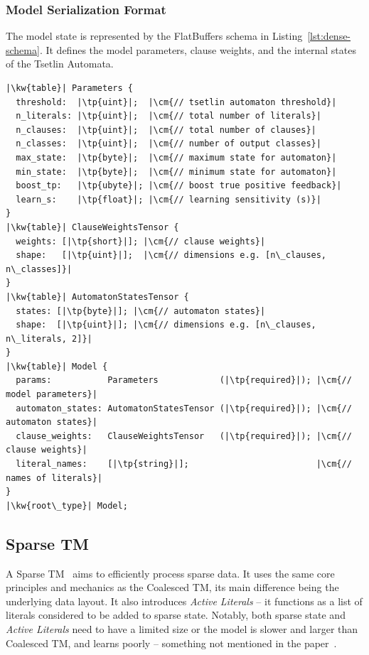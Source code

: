 \subsubsection{Model Serialization Format}

The model state is represented by the FlatBuffers schema in Listing~\ref{lst:dense-schema}. It defines the model parameters, clause weights, and the internal states of the Tsetlin Automata.

\begin{listing}[!htbp]
    \caption[Coalesced TM FlatBuffers serialization format]{Coalesced TM FlatBuffers serialization format\label{lst:dense-schema}}
    \begin{verbatim}
|\kw{table}| Parameters {
  threshold:  |\tp{uint}|;  |\cm{// tsetlin automaton threshold}|
  n_literals: |\tp{uint}|;  |\cm{// total number of literals}|
  n_clauses:  |\tp{uint}|;  |\cm{// total number of clauses}|
  n_classes:  |\tp{uint}|;  |\cm{// number of output classes}|
  max_state:  |\tp{byte}|;  |\cm{// maximum state for automaton}|
  min_state:  |\tp{byte}|;  |\cm{// minimum state for automaton}|
  boost_tp:   |\tp{ubyte}|; |\cm{// boost true positive feedback}|
  learn_s:    |\tp{float}|; |\cm{// learning sensitivity (s)}|
}
|\kw{table}| ClauseWeightsTensor {
  weights: [|\tp{short}|]; |\cm{// clause weights}|
  shape:   [|\tp{uint}|];  |\cm{// dimensions e.g. [n\_clauses, n\_classes]}|
}
|\kw{table}| AutomatonStatesTensor {
  states: [|\tp{byte}|]; |\cm{// automaton states}|
  shape:  [|\tp{uint}|]; |\cm{// dimensions e.g. [n\_clauses, n\_literals, 2]}|
}
|\kw{table}| Model {
  params:           Parameters            (|\tp{required}|); |\cm{// model parameters}|
  automaton_states: AutomatonStatesTensor (|\tp{required}|); |\cm{// automaton states}|
  clause_weights:   ClauseWeightsTensor   (|\tp{required}|); |\cm{// clause weights}|
  literal_names:    [|\tp{string}|];                         |\cm{// names of literals}|
}
|\kw{root\_type}| Model;
    \end{verbatim}
\end{listing}

\subsection{Sparse TM}
A Sparse TM~\cite{glimsdal2024sparsetsetlinmachine} aims to efficiently process sparse data. It uses the same core principles and mechanics as the Coalesced TM, its main difference being the underlying data layout. It also introduces \textit{Active Literals} -- it functions as a list of literals considered to be added to sparse state. Notably, both sparse state and \textit{Active Literals} need to have a limited size or the model is slower and larger than Coalesced TM, and learns poorly -- something not mentioned in the paper~\cite{glimsdal2024sparsetsetlinmachine}.

